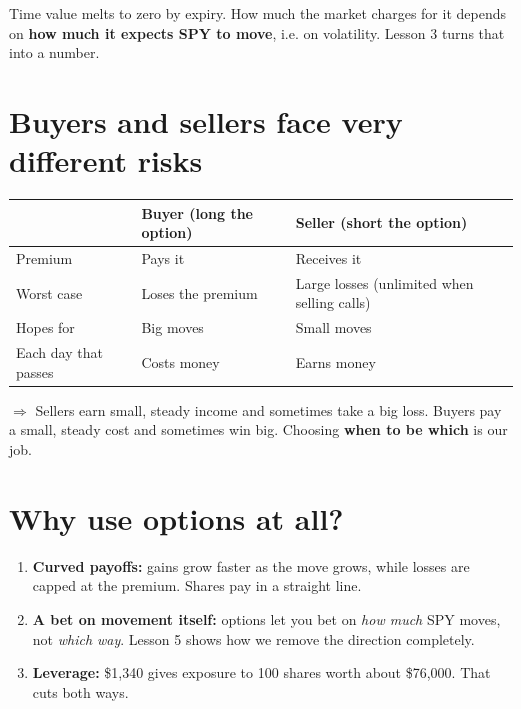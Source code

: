 \documentclass{article}
\begin{document}
Time value melts to zero by expiry. How much the market charges for it depends on \textbf{how much it expects SPY to move}, i.e. on volatility. Lesson 3 turns that into a number.

\section{Buyers and sellers face very different risks}

\begin{center}\small
\begin{tabularx}{\linewidth}{>{\raggedright\arraybackslash}X >{\raggedright\arraybackslash}X >{\raggedright\arraybackslash}X}
\toprule
\textbf{} & \textbf{Buyer (long the option)} & \textbf{Seller (short the option)} \\
\midrule
Premium & Pays it & Receives it \\
Worst case & Loses the premium & Large losses (unlimited when selling calls) \\
Hopes for & Big moves & Small moves \\
Each day that passes & Costs money & Earns money \\
\bottomrule
\end{tabularx}
\end{center}

\textbf{$\Rightarrow$} Sellers earn small, steady income and sometimes take a big loss. Buyers pay a small, steady cost and sometimes win big. Choosing \textbf{when to be which} is our job.

\section{Why use options at all?}

\begin{enumerate}

\item \textbf{Curved payoffs:} gains grow faster as the move grows, while losses are capped at the premium. Shares pay in a straight line.

\item \textbf{A bet on movement itself:} options let you bet on \emph{how much} SPY moves, not \emph{which way}. Lesson 5 shows how we remove the direction completely.

\item \textbf{Leverage:} \$1,340 gives exposure to 100 shares worth about \$76,000. That cuts both ways.

\end{enumerate}
\end{document}
